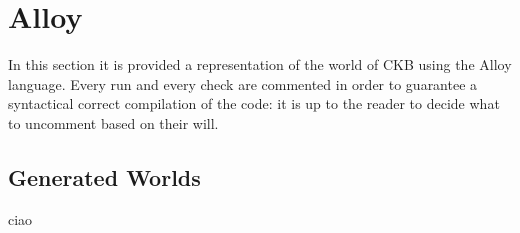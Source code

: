 \chapter{Alloy}

In this section it is provided a representation of the world of CKB using the Alloy language. Every
run and every check are commented in order to guarantee a syntactical correct compilation of the
code: it is up to the reader to decide what to uncomment based on their will.



\newpage
\section{Generated Worlds}

ciao